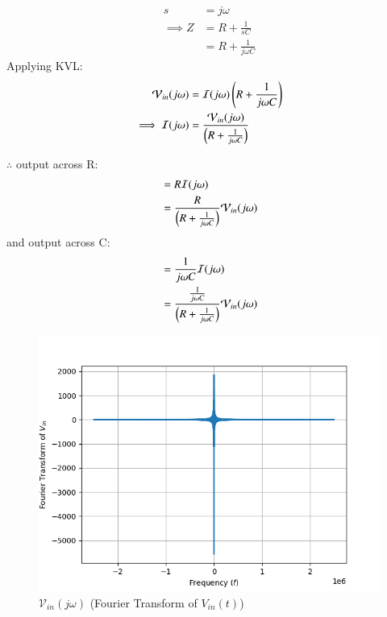 \documentclass[journal,12pt,twocolumn]{IEEEtran}
\theoremstyle{remark}
\begin{document}

\begin{align}
    s &= j\omega\\
    \implies Z &= R + \frac{1}{sC}\\
    &= R + \frac{1}{j\omega C}
\end{align}
Applying KVL:
\begin{align}
    \mathcal{V}_{in}(j\omega) &= \mathcal{I}(j\omega)\left(R + \frac{1}{j\omega C}\right)\\
    \implies \mathcal{I}(j\omega) &= \frac{\mathcal{V}_{in}(j\omega)}{\left(R + \frac{1}{j\omega C}\right)}
\end{align}

$\therefore$ output across R:
\begin{align}
    &= R\mathcal{I}(j\omega)\\
    &= \frac{R}{\left(R + \frac{1}{j\omega C}\right)}\mathcal{V}_{in}(j\omega)
\end{align}
and output across C:
\begin{align}
    &= \frac{1}{j\omega C}\mathcal{I}(j\omega)\\
    &= \frac{\frac{1}{j\omega C}}{\left(R + \frac{1}{j\omega C}\right)}\mathcal{V}_{in}(j\omega)
\end{align}

\begin{figure}[!h]
    \centering
    \includegraphics[width = \columnwidth]{figs/square_fourier.png}
    \caption{$\mathcal{V}_{in}(j\omega)$ (Fourier Transform of $V_{in}(t)$)}
    \label{fig:square_fft_gate.ph.23.37}
\end{figure}
\end{document}

